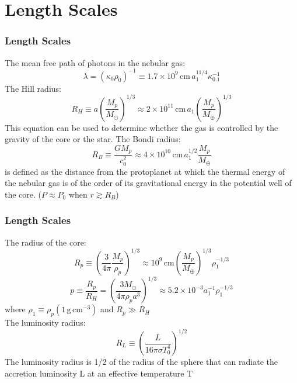 \documentclass{beamer}
\begin{document}
\section{Length Scales}
\begin{frame}
\frametitle{Length Scales}
The mean free path of photons in the nebular gas:
\begin{equation}
\lambda = {(\kappa_0 \rho_0)}^{-1} \equiv 1.7 \times 10^9 \, \text{cm} \, a_1^{11/4} \kappa_{0.1}^{-1}
\end{equation}
The Hill radius:
\begin{equation}
R_H \equiv a \left( \frac{M_p}{M_\odot} \right)^{1/3} \approx 2 \times 10^{11} \, \text{cm} \, a_1 \left( \frac{M_p}{M_\oplus} \right)^{1/3}
\end{equation}
This equation can be used to determine whether the gas is controlled by the gravity of the core or the star.
The Bondi radius:
\begin{equation}
R_B \equiv \frac{G M_p}{c_0^2} \approx 4 \times 10^{10} \, \text{cm} \, a_1^{1/2} \frac{M_p}{M_\oplus}
\end{equation}
is defined as the distance from the protoplanet at which the thermal energy of the nebular gas is of the order of its gravitational energy in the potential well of the core. ($P \approx P_0$ when $r \gtrsim R_B$)
\end{frame}

\begin{frame}
\frametitle{Length Scales}
The radius of the core:
\begin{equation}
R_p \equiv \left( \frac{3}{4 \pi} \frac{M_p}{\rho_p} \right)^{1/3} \approx 10^9 \, \text{cm} \left( \frac{M_p}{M_\oplus} \right)^{1/3} \rho_1^{-1/3}
\end{equation}
\begin{equation}
p \equiv \frac{R_p}{R_H} = \left( \frac{3 M_\odot}{4 \pi \rho_p a^3} \right)^{1/3} \approx 5.2 \times 10^{-3} a_1^{-1} \rho_1^{-1/3} 
\end{equation}
where $\rho_1 \equiv \rho_p (1 \, \text{g} \, \text{cm}^{-3})$ and $R_p \gg R_H$\\
The luminosity radius:
\begin{equation}
R_L \equiv \left( \frac{L}{16 \pi \sigma T_0^4} \right)^{1/2}
\end{equation}
The luminosity radius is 1/2 of the radius of the sphere that can radiate the accretion luminosity L at an effective temperature T
\end{frame}
\end{document}
